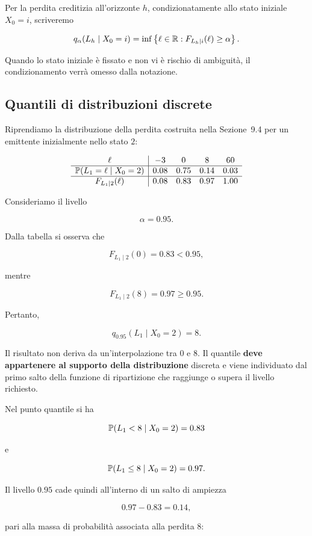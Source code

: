 Per la perdita creditizia all'orizzonte $h$, condizionatamente allo
stato iniziale $X_0=i$, scriveremo

\[
q_{\alpha}(L_h\mid X_0=i)
=
\inf
\left\{
\ell\in\mathbb{R}:
F_{L_h\mid i}(\ell)\geq\alpha
\right\}.
\]

Quando lo stato iniziale \`{e} fissato e non vi \`{e} rischio di
ambiguit\`{a}, il condizionamento verr\`{a} omesso dalla notazione.

\subsection{Quantili di distribuzioni discrete}

\label{subsec:cap9-quantili-discreti}

Riprendiamo la distribuzione della perdita costruita nella
Sezione~9.4 per un emittente inizialmente nello stato $2$:

\[
\begin{array}{c|cccc}
\ell
&
-3
&
0
&
8
&
60
\\
\hline
\mathbb{P}(L_1=\ell\mid X_0=2)
&
0.08
&
0.75
&
0.14
&
0.03
\\
\hline
F_{L_1\mid 2}(\ell)
&
0.08
&
0.83
&
0.97
&
1.00
\end{array}
\]

Consideriamo il livello

\[
\alpha=0.95.
\]

Dalla tabella si osserva che

\[
F_{L_1\mid 2}(0)=0.83<0.95,
\]

mentre

\[
F_{L_1\mid 2}(8)=0.97\geq0.95.
\]

Pertanto,

\[
q_{0.95}(L_1\mid X_0=2)=8.
\]

Il risultato non deriva da un'interpolazione tra $0$ e $8$.
Il quantile \textbf{deve appartenere al supporto della distribuzione} discreta
e viene individuato dal primo salto della funzione di ripartizione che
raggiunge o supera il livello richiesto.

Nel punto quantile si ha

\[
\mathbb{P}(L_1<8\mid X_0=2)=0.83
\]

e

\[
\mathbb{P}(L_1\leq8\mid X_0=2)=0.97.
\]

Il livello $0.95$ cade quindi all'interno di un salto di ampiezza

\[
0.97-0.83=0.14,
\]

pari alla massa di probabilit\`{a} associata alla perdita $8$:

